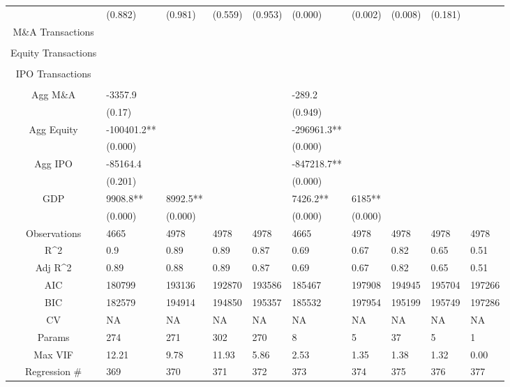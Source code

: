 \documentclass{article}
\begin{document}
\begin{table}[H]
\begin{tabular}{|clllllllll|}
   & (0.882) & (0.981) & (0.559) & (0.953) & (0.000) & (0.002) & (0.008) & (0.181) &  \\ 
  M\&A Transactions &  &  &  &  &  &  &  &  &  \\ 
   &  &  &  &  &  &  &  &  &  \\ 
  Equity Transactions &  &  &  &  &  &  &  &  &  \\ 
   &  &  &  &  &  &  &  &  &  \\ 
  IPO Transactions &  &  &  &  &  &  &  &  &  \\ 
   &  &  &  &  &  &  &  &  &  \\ 
  Agg M\&A & -3357.9 &  &  &  & -289.2 &  &  &  &  \\ 
   & (0.17) &  &  &  & (0.949) &  &  &  &  \\ 
  Agg Equity & -100401.2** &  &  &  & -296961.3** &  &  &  &  \\ 
   & (0.000) &  &  &  & (0.000) &  &  &  &  \\ 
  Agg IPO & -85164.4 &  &  &  & -847218.7** &  &  &  &  \\ 
   & (0.201) &  &  &  & (0.000) &  &  &  &  \\ 
  GDP & 9908.8** & 8992.5** &  &  & 7426.2** & 6185** &  &  &  \\ 
   & (0.000) & (0.000) &  &  & (0.000) & (0.000) &  &  &  \\ 
  \hline 
 Observations & 4665 & 4978 & 4978 & 4978 & 4665 & 4978 & 4978 & 4978 & 4978 \\ 
  R^2 & 0.9 & 0.89 & 0.89 & 0.87 & 0.69 & 0.67 & 0.82 & 0.65 & 0.51 \\ 
  Adj R^2 & 0.89 & 0.88 & 0.89 & 0.87 & 0.69 & 0.67 & 0.82 & 0.65 & 0.51 \\ 
  AIC & 180799 & 193136 & 192870 & 193586 & 185467 & 197908 & 194945 & 195704 & 197266 \\ 
  BIC & 182579 & 194914 & 194850 & 195357 & 185532 & 197954 & 195199 & 195749 & 197286 \\ 
  CV & NA & NA & NA & NA & NA & NA & NA & NA & NA \\ 
  Params & 274 & 271 & 302 & 270 & 8 & 5 & 37 & 5 & 1 \\ 
  Max VIF & 12.21 & 9.78 & 11.93 & 5.86 & 2.53 & 1.35 & 1.38 & 1.32 & 0.00 \\ 
  Regression \# & 369 & 370 & 371 & 372 & 373 & 374 & 375 & 376 & 377 \\ 
   \hline
\end{tabular}
 
\end{table}
\end{document}
